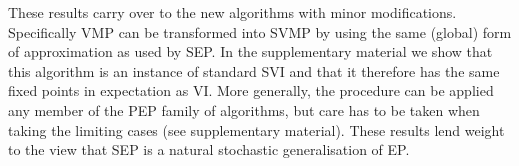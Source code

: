 These results carry over to the new algorithms with minor modifications. Specifically VMP can be transformed into SVMP by using the same (global) form of approximation as used by SEP. In the supplementary material we show that this algorithm is an instance of standard SVI and that it therefore has the same fixed points in expectation as VI. 
%
More generally, the procedure can be applied any member of the PEP family of algorithms, but care has to be taken when taking the limiting cases (see supplementary material).
%
These results lend weight to the view that SEP is a natural stochastic generalisation of EP.




